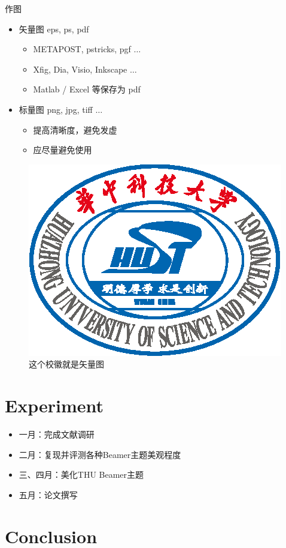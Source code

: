 \documentclass{beamer}
\begin{document}
\begin{frame}{作图}
    \begin{itemize}
        \item 矢量图 eps, ps, pdf
            \begin{itemize}
                \item METAPOST, pstricks, pgf $\ldots$
                \item Xfig, Dia, Visio, Inkscape $\ldots$
                \item Matlab / Excel 等保存为 pdf
            \end{itemize}
        \item 标量图 png, jpg, tiff $\ldots$
            \begin{itemize}
                \item 提高清晰度，避免发虚
                \item 应尽量避免使用
            \end{itemize}
    \end{itemize}
    \begin{figure}[htpb]
        \centering
        \includegraphics[width=0.2\linewidth]{images/templates/HUST_LOGO.eps}
        \caption{这个校徽就是矢量图}
    \end{figure}
\end{frame}

\section{Experiment}

\begin{frame}
    \begin{itemize}
        \item 一月：完成文献调研
        \item 二月：复现并评测各种Beamer主题美观程度
        \item 三、四月：美化THU Beamer主题
        \item 五月：论文撰写
    \end{itemize}
\end{frame}

\section{Conclusion}
\end{document}
